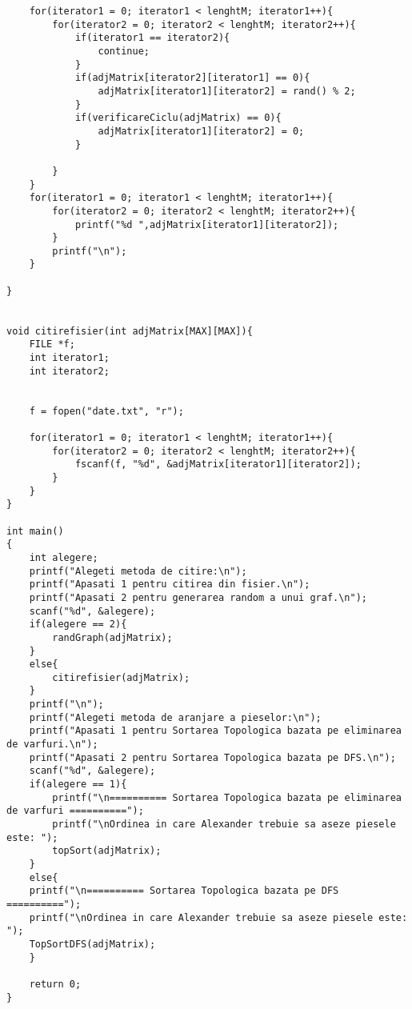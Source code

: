 \documentclass[14pt]{article}
\begin{document}
\begin{lstlisting}
    for(iterator1 = 0; iterator1 < lenghtM; iterator1++){
        for(iterator2 = 0; iterator2 < lenghtM; iterator2++){
            if(iterator1 == iterator2){
                continue;
            }
            if(adjMatrix[iterator2][iterator1] == 0){
                adjMatrix[iterator1][iterator2] = rand() % 2;
            }
            if(verificareCiclu(adjMatrix) == 0){
                adjMatrix[iterator1][iterator2] = 0;
            }

        }
    }
    for(iterator1 = 0; iterator1 < lenghtM; iterator1++){
        for(iterator2 = 0; iterator2 < lenghtM; iterator2++){
            printf("%d ",adjMatrix[iterator1][iterator2]);
        }
        printf("\n");
    }

}


void citirefisier(int adjMatrix[MAX][MAX]){
    FILE *f;
    int iterator1;
    int iterator2;


    f = fopen("date.txt", "r");

    for(iterator1 = 0; iterator1 < lenghtM; iterator1++){
        for(iterator2 = 0; iterator2 < lenghtM; iterator2++){
            fscanf(f, "%d", &adjMatrix[iterator1][iterator2]);
        }
    }
}

int main()
{
    int alegere;
    printf("Alegeti metoda de citire:\n");
    printf("Apasati 1 pentru citirea din fisier.\n");
    printf("Apasati 2 pentru generarea random a unui graf.\n");
    scanf("%d", &alegere);
    if(alegere == 2){
        randGraph(adjMatrix);
    }
    else{
        citirefisier(adjMatrix);
    }
    printf("\n");
    printf("Alegeti metoda de aranjare a pieselor:\n");
    printf("Apasati 1 pentru Sortarea Topologica bazata pe eliminarea de varfuri.\n");
    printf("Apasati 2 pentru Sortarea Topologica bazata pe DFS.\n");
    scanf("%d", &alegere);
    if(alegere == 1){
        printf("\n========== Sortarea Topologica bazata pe eliminarea de varfuri ==========");
        printf("\nOrdinea in care Alexander trebuie sa aseze piesele este: ");
        topSort(adjMatrix);
    }
    else{
    printf("\n========== Sortarea Topologica bazata pe DFS ==========");
    printf("\nOrdinea in care Alexander trebuie sa aseze piesele este: ");
    TopSortDFS(adjMatrix);
    }

    return 0;
}

\end{lstlisting}

\newpage
\end{document}
